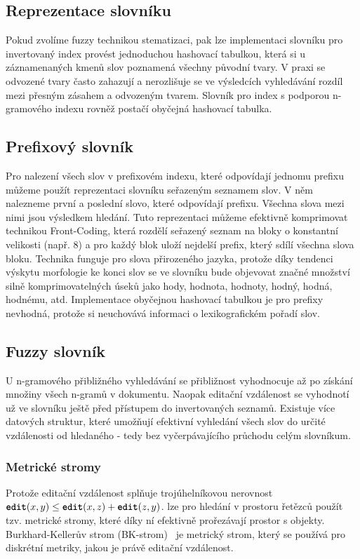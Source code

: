 \documentclass[11pt,letterpaper,oneside,openright]{book}
\newcommand{\bftt}[1]{\texttt{\textbf{#1}}}
\begin{document}

\subsection{Reprezentace slovníku}
Pokud zvolíme fuzzy technikou stematizaci, pak lze implementaci slovníku pro
invertovaný index provést jednoduchou hashovací tabulkou, která si u
záznamenaných kmenů slov poznamená všechny původní tvary. V praxi se odvozené
tvary často zahazují a nerozlišuje se ve výsledcích vyhledávání rozdíl mezi
přesným zásahem a odvozeným tvarem. Slovník pro index s podporou n-gramového
indexu rovněž postačí obyčejná hashovací tabulka.

\subsection{Prefixový slovník}
Pro nalezení všech slov v prefixovém indexu, které odpovídají jednomu prefixu
můžeme použít reprezentaci slovníku seřazeným seznamem slov. V něm nalezneme
první a poslední slovo, které odpovídají prefixu. Všechna slova mezi nimi jsou
výsledkem hledání.  Tuto reprezentaci můžeme efektivně komprimovat technikou
Front-Coding, která rozdělí seřazený seznam na bloky o konstantní velikosti
(např. 8) a pro každý blok uloží nejdelší prefix, který sdílí všechna slova
bloku. Technika funguje pro slova přirozeného jazyka, protože díky tendenci
výskytu morfologie ke konci slov se ve slovníku bude objevovat značné množství
silně komprimovatelných úseků jako hody, hodnota, hodnoty, hodný, hodná,
hodnému, atd. Implementace obyčejnou hashovací tabulkou je pro prefixy
nevhodná, protože si neuchovává informaci o lexikografickém pořadí slov.

\subsection{Fuzzy slovník}
U n-gramového přibližného vyhledávání se přibližnost vyhodnocuje až po získání
množiny všech n-gramů v dokumentu. Naopak editační vzdálenost se vyhodnotí už ve
slovníku ještě před přístupem do invertovaných seznamů. Existuje více datových
struktur, které umožňují efektivní vyhledání všech slov do určité vzdálenosti
od hledaného - tedy bez vyčerpávajícího průchodu celým slovníkum.

\subsubsection{Metrické stromy}
Protože editační vzdálenost splňuje trojúhelníkovou nerovnost $\bftt{edit}(x,y)
\leq \bftt{edit}(x,z) + \bftt{edit}(z,y)$. lze pro hledání v prostoru řetězců
použít tzv. metrické stromy, které díky ní efektivně prořezávají prostor s
objekty. Burkhard-Kellerův strom
(BK-strom)~\cite{Burkhard:1973:ABF:362003.362025} je metrický strom, který se
používá pro diskrétní metriky, jakou je právě editační vzdálenost.
\end{document}
